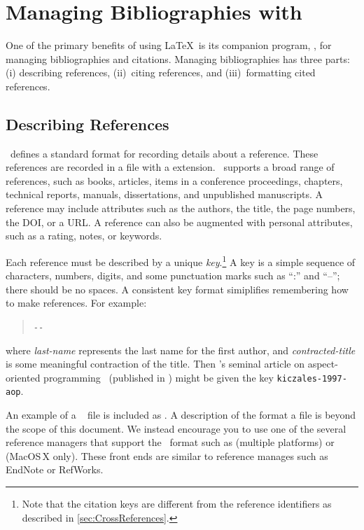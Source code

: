 \section{Managing Bibliographies with \BibTeX}
\label{sec:BibTeX}

One of the primary benefits of using \LaTeX\ is its companion program,
\BibTeX, for managing bibliographies and citations.  Managing
bibliographies has three parts: (i) describing references,
(ii)~citing references, and (iii)~formatting cited references.

\subsection{Describing References}

\BibTeX\ defines a standard format for recording details about a
reference.  These references are recorded in a file with a
 extension.  \BibTeX\ supports a broad range of
references, such as books, articles, items in a conference proceedings,
chapters, technical reports, manuals, dissertations, and unpublished
manuscripts. 
A reference may include attributes such as the authors,
the title, the page numbers, the \ac{DOI}, or a \ac{URL}.  A reference
can also be augmented with personal attributes, such as a rating,
notes, or keywords.

Each reference must be described by a unique \emph{key}.\footnote{%
    Note that the citation keys are different from the reference
    identifiers as described in \autoref{sec:CrossReferences}.}
A key is a simple sequence of characters, numbers, digits, and some
punctuation marks such as ``:'' and ``--''; there should be no spaces. 
A consistent key format simiplifies remembering how to make references. 
For example:
\begin{quote}
   \texttt{-}\texttt{-}
\end{quote}
where \emph{last-name} represents the last name for the first author,
and \emph{contracted-title} is some meaningful contraction of the
title.  Then \citeauthor{kiczales-1997-aop}'s seminal article on
aspect-oriented programming~\cite{kiczales-1997-aop} (published in
\citeyear{kiczales-1997-aop}) might be given the key
\texttt{kiczales-1997-aop}.

An example of a \BibTeX\  file is included as
.  A description of the format a 
file is beyond the scope of this document.  We instead encourage
you to use one of the several reference managers that support the
\BibTeX\ format such as
 (multiple platforms) or
 (MacOS\,X only). 
These front ends are similar to reference manages such as
EndNote or RefWorks.


